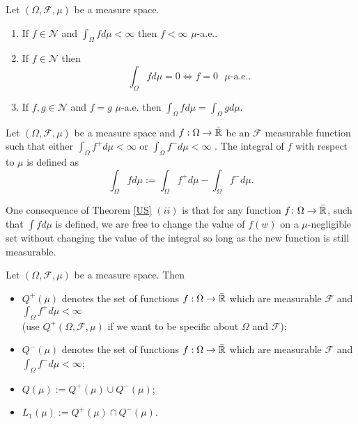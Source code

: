 \begin{theorem} \label{US}
 Let $(\Omega, \mathcal F, \mu)$ be a measure space.
\begin{enumerate}
\item If $f\in \mathscr N$ and $\int_\Omega f d\mu<\infty$ then $f<\infty $ $\mu$-a.e..
\item If $f\in \mathscr N$ then
\[ \int_\Omega fd\mu =0 \Longleftrightarrow f=0   \text{ $\mu$-a.e..}
\]
\item  If $f,g\in \mathscr N$ and $f=g$ $\mu$-a.e. then $ \int_\Omega f d\mu = \int_\Omega g d\mu $.
\end{enumerate}
\end{theorem}





\begin{definition}
Let $(\Omega, \mathcal F, \mu)$ be a measure space and $f:\Omega\rightarrow \bar{\Bbb R}$ be an $\mathcal F$ measurable function  such that either $\int_{\Omega} f^+ d\mu<\infty $ or $\int_{\Omega} f^- d\mu<\infty $ .   The  integral of $f$ with respect to $\mu$ is defined as
\[ \int_{\Omega} f d\mu:= \int_{\Omega} f^+ d\mu-\int_{\Omega} f^- d\mu. \]
\end{definition}

\begin{remark}
One consequence of Theorem \ref{US} $(ii)$ is that for any function $f\colon \Omega \rightarrow \bar{\Bbb R}$, such that $\int f d\mu$ is defined,  we are free to change the value of $f(w)$ on a $\mu$-negligible set without changing the value of the integral so long as the new function is still measurable.
\end{remark}





\begin{definition}
Let $(\Omega, \mathcal F, \mu)$ be a measure space. Then
\begin{itemize}
\item  $Q^+( \mu)$ denotes the set of  functions $f:\Omega\rightarrow \bar{\Bbb R}$ which are measurable $\mathcal F$ and $\int_\Omega f^+ d\mu<\infty$ \\
(use $Q^+(\Omega, \mathcal F, \mu)$ if we want to be specific about $\Omega$ and $\mathcal F$);
\item
$ Q^-( \mu)$ denotes the set of  functions $f:\Omega\rightarrow \bar{\Bbb R}$ which are measurable $\mathcal F$ and $\int_\Omega f^- d\mu<\infty$;
\item  $Q(\mu):=Q^+(\mu)\cup  Q^-(\mu)$;
\item $L_1(\mu):= Q^+(\mu)\cap Q^-(\mu)$.
\end{itemize}
\end{definition}





